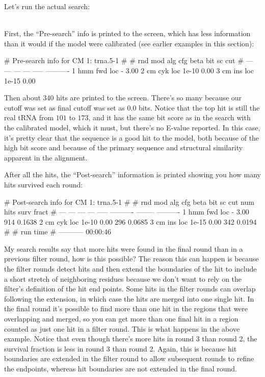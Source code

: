 Let's run the actual search:

\\

First, the ``Pre-search'' info is printed to the screen, which has
less information than it would if the model were calibrated (see
earlier examples in this section): 

\begin{sreoutput}
# Pre-search info for CM 1: trna.5-1
#
# rnd  mod  alg  cfg   beta  bit sc cut
# ---  ---  ---  ---  -----  ----------
    1  hmm  fwd  loc      -        3.00
    2   cm  cyk  loc  1e-10        0.00
    3   cm  ins  loc  1e-15        0.00
\end{sreoutput}

Then about 340 hits are printed to the screen. There's so many because
our cutoff was set as final cutoff was set as $0.0$ bits. Notice that 
the top hit is still the real tRNA from $101$ to $173$, and it 
has the same bit score as in the search with the calibrated model,
which it must, but there's no E-value reported. In this case, it's
pretty clear that the sequence is a good hit to the model, both
because of the high bit score and because of the primary sequence and
structural similarity apparent in the  alignment. 

After all the hits, the ``Post-search'' information is printed showing
you how many hits survived each round:

\begin{sreoutput}
# Post-search info for CM 1: trna.5-1
#
# rnd  mod  alg  cfg   beta  bit sc cut  num hits  surv fract
# ---  ---  ---  ---  -----  ----------  --------  ----------
    1  hmm  fwd  loc      -        3.00       914      0.1638
    2   cm  cyk  loc  1e-10        0.00       296      0.0685
    3   cm  ins  loc  1e-15        0.00       342      0.0194
#
#    run time
# -----------
     00:00:46
\end{sreoutput}

\begin{srefaq}{My search results say that more hits were found in the
final round than in a previous filter round, how is this possible?}
The reason this can happen is because the filter
rounds detect hits and then extend the boundaries of the hit to
include a short stretch of neighboring residues because
we don't want to rely on the filter's definition of the hit end
points. Some hits in the filter rounds can overlap following the
extension, in which case the hits are merged into one single hit. In the
final round it's possible to find more than one hit in the regions that
were overlapping and merged, so you can get more than one final hit in a
region counted as just one hit in a filter round. This is what happens
in the above example. Notice that even though there's more hits in
round 3 than round 2, the survival fraction is less in round 3 than
round 2. Again, this is because hit boundaries are extended in the
filter round to allow subsequent rounds to refine the endpoints,
whereas hit boundaries are not extended in the final round.
\end{srefaq}

